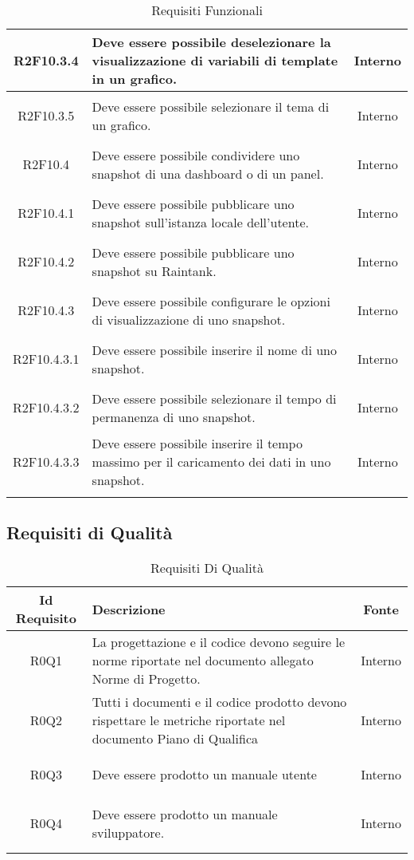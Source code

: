 \begin{longtable}{|c|H|c|}
	\hypertarget{R2F10.3.4}{R2F10.3.4} &  Deve essere possibile deselezionare la visualizzazione di variabili di template in un grafico. & Interno \\ \hline 
	\hypertarget{R2F10.3.5}{R2F10.3.5} & Deve essere possibile selezionare il tema di un grafico. & Interno \\ \hline 
	\hypertarget{R2F10.4}{R2F10.4} & Deve essere possibile condividere uno snapshot di una dashboard o di un panel. & Interno \\ \hline 
	\hypertarget{R2F10.4.1}{R2F10.4.1} & Deve essere possibile pubblicare uno snapshot sull’istanza locale dell’utente. & Interno \\ \hline 
	\hypertarget{R2F10.4.2}{R2F10.4.2} & Deve essere possibile pubblicare uno snapshot su Raintank. & Interno \\ \hline 
	\hypertarget{R2F10.4.3}{R2F10.4.3} & Deve essere possibile configurare le opzioni di visualizzazione di uno snapshot. & Interno \\ \hline 
	\hypertarget{R2F10.4.3.1}{R2F10.4.3.1} & Deve essere possibile inserire il nome di uno snapshot. & Interno \\ \hline 
	\hypertarget{R2F10.4.3.2}{R2F10.4.3.2} & Deve essere possibile selezionare il tempo di permanenza di uno snapshot. & Interno \\ \hline 
	\hypertarget{R2F10.4.3.3}{R2F10.4.3.3} & Deve essere possibile inserire il tempo massimo per il caricamento dei dati in uno snapshot. & Interno \\ \hline 
	
	\caption[Requisiti Funzionali]{Requisiti Funzionali}
	\label{tabella:req0}
\end{longtable}
\clearpage
{}
\subsection{Requisiti di Qualità}
\normalsize
\begin{longtable}{|c|H|c|}
	\hline
	\textbf{Id Requisito} & \textbf{Descrizione} & \textbf{Fonte}\\
	\hline
	\endhead
	\hypertarget{R0Q1}{R0Q1} & La progettazione e il codice devono seguire le norme riportate nel documento allegato Norme di Progetto. & Interno \\ \hline 
	\hypertarget{R0Q2}{R0Q2} & Tutti i documenti e il codice prodotto devono rispettare le metriche riportate nel documento Piano di Qualifica & Interno \\ \hline 
	\hypertarget{R0Q3}{R0Q3} & Deve essere prodotto un manuale utente & Interno \\ \hline 
	\hypertarget{R0Q4}{R0Q4} & Deve essere prodotto un manuale sviluppatore. & Interno \\ \hline 
	\caption[Requisiti di Qualità]{Requisiti Di Qualità}
	\label{tabella:req1}
\end{longtable}
\clearpage
{}
